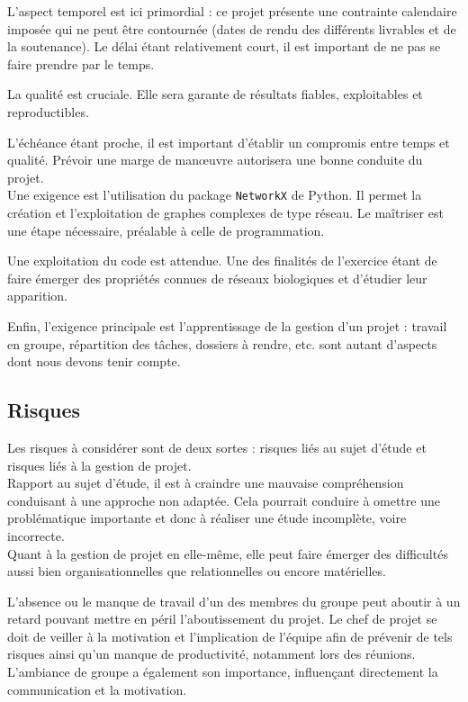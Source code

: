 L'aspect temporel est ici primordial : ce projet présente une contrainte calendaire imposée qui ne peut être contournée (dates de rendu des différents livrables et de la soutenance). Le délai étant relativement court, il est important de ne pas se faire prendre par le temps.

La qualité est cruciale. Elle sera garante de résultats fiables, exploitables et reproductibles. 

L'échéance étant proche, il est important d'établir un compromis entre temps et qualité. Prévoir une marge de manœuvre autorisera une bonne conduite du projet.\\

Une exigence est l'utilisation du package \verb?NetworkX? de Python. Il permet la création et l'exploitation de graphes complexes de type réseau. Le maîtriser est une étape nécessaire, préalable à celle de programmation.

Une exploitation du code est attendue. Une des finalités de l'exercice étant de faire émerger des propriétés connues de réseaux biologiques et d'étudier leur apparition.

Enfin, l'exigence principale est l'apprentissage de la gestion d'un projet : travail en groupe, répartition des tâches, dossiers à rendre, etc. sont autant d'aspects dont nous devons tenir compte.

\subsection{Risques}
Les risques à considérer sont de deux sortes : risques liés au sujet d'étude et risques liés à la gestion de projet.\\

Rapport au sujet d'étude, il est à craindre une mauvaise compréhension conduisant à une approche non adaptée. Cela pourrait conduire à omettre une problématique importante et donc à réaliser une étude incomplète, voire incorrecte.\\

Quant à la gestion de projet en elle-même, elle peut faire émerger des difficultés aussi bien organisationnelles que relationnelles ou encore matérielles.

L'absence ou le manque de travail d'un des membres du groupe peut aboutir à un retard pouvant mettre en péril l'aboutissement du projet. Le chef de projet se doit de veiller à la motivation et l'implication de l'équipe afin de prévenir de tels risques ainsi qu'un manque de productivité, notamment lors des réunions. L'ambiance de groupe a également son importance, influençant directement la communication et la motivation.


